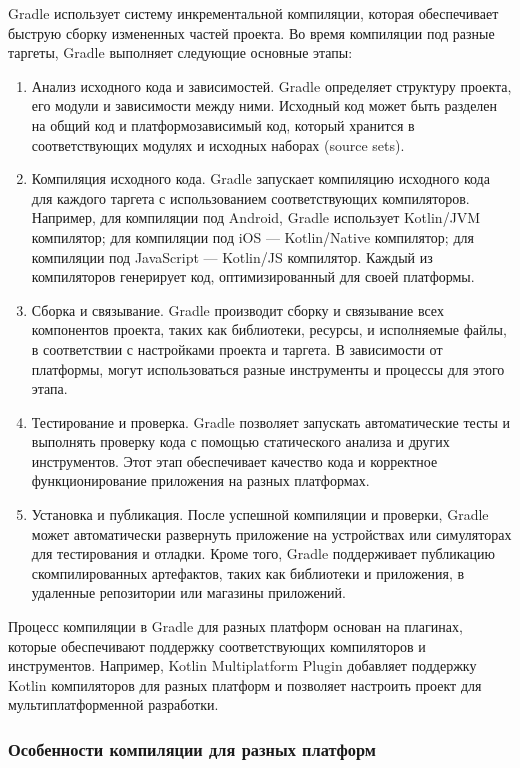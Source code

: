 \documentclass[14pt, russian]{scrartcl}
\begin{document}
Gradle использует систему инкрементальной компиляции, которая обеспечивает быструю сборку измененных частей проекта. Во время компиляции под разные таргеты, Gradle выполняет следующие основные этапы:

\begin{enumerate}
    \item Анализ исходного кода и зависимостей. Gradle определяет структуру проекта, его модули и зависимости между ними. Исходный код может быть разделен на общий код и платформозависимый код, который хранится в соответствующих модулях и исходных наборах (source sets).
    \item Компиляция исходного кода. Gradle запускает компиляцию исходного кода для каждого таргета с использованием соответствующих компиляторов. Например, для компиляции под Android, Gradle использует Kotlin/JVM компилятор; для компиляции под iOS --- Kotlin/Native компилятор; для компиляции под JavaScript --- Kotlin/JS компилятор. Каждый из компиляторов генерирует код, оптимизированный для своей платформы.
    \item Сборка и связывание. Gradle производит сборку и связывание всех компонентов проекта, таких как библиотеки, ресурсы, и исполняемые файлы, в соответствии с настройками проекта и таргета. В зависимости от платформы, могут использоваться разные инструменты и процессы для этого этапа.
    \item Тестирование и проверка. Gradle позволяет запускать автоматические тесты и выполнять проверку кода с помощью статического анализа и других инструментов. Этот этап обеспечивает качество кода и корректное функционирование приложения на разных платформах.
    \item Установка и публикация. После успешной компиляции и проверки, Gradle может автоматически развернуть приложение на устройствах или симуляторах для тестирования и отладки. Кроме того, Gradle поддерживает публикацию скомпилированных артефактов, таких как библиотеки и приложения, в удаленные репозитории или магазины приложений.
\end{enumerate}

Процесс компиляции в Gradle для разных платформ основан на плагинах, которые обеспечивают поддержку соответствующих компиляторов и инструментов. Например, Kotlin Multiplatform Plugin добавляет поддержку Kotlin компиляторов для разных платформ и позволяет настроить проект для мультиплатформенной разработки.

\subsubsection{Особенности компиляции для разных платформ}
\end{document}
